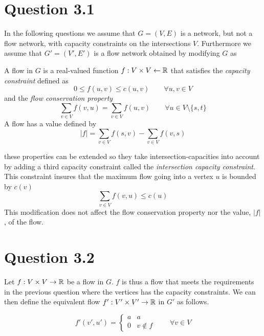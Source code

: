 \documentclass[10pt]{article}
\begin{document}



\section*{Question 3.1} %
\label{sec:question_3_1}
In the following questions we assume that $G = (V,E)$ is a network, but not a flow network, with capacity constraints on the intersections $V$. Furthermore we assume that $G' = (V',E')$ is a flow network obtained by modifying $G$ as 

A flow in $G$ is a real-valued function $f: V \times V \leftarrow \mathbb R$ that satisfies the \emph{capacity constraint} defined as
\begin{equation}
 0 \leq f(u,v) \leq c(u,v) \qquad  \forall u,v \in V
\end{equation}
and the \emph{flow conservation property}
\begin{equation}
\sum_{v \in V} f(v,u) = \sum_{v \in V} f(u,v)  \qquad \forall u \in V \setminus \{s,t\}
\end{equation}
A flow has a value defined by
\begin{equation}
 |f| = \sum_{v \in V} f(s,v) - \sum_{v \in V} f(v,s)
\end{equation}

these properties can be extended so they take intersection-capacities into account by adding a third capacity constraint called the \emph{intersection capacity constraint}. This constraint insures that the maximum flow going into a vertex $u$ is bounded by $c(v)$
\begin{equation}
\sum_{v \in V} f(v,u) \leq c(u) 
\end{equation}
This modification does not affect the flow conservation property nor the value, $|f|$, of the flow.


\section*{Question 3.2} %
\label{sec:question_3_2}
Let $f: V \times V \rightarrow \mathbb R$ be a flow in $G$. $f$ is thus a flow that meets the requirements in the previous question where the vertices has the capacity constraints. We can then define the equivalent flow $f': V' \times V' \rightarrow \mathbb R$ in $G'$ as follows. 

\begin{equation} 
f'(v',u') = 
\left\{
\begin{array}{rl} 
  a & a \\
  0 & v \notin  f 
\end{array} 
\right. \qquad \forall v \in V
\end{equation} 
\end{document}
